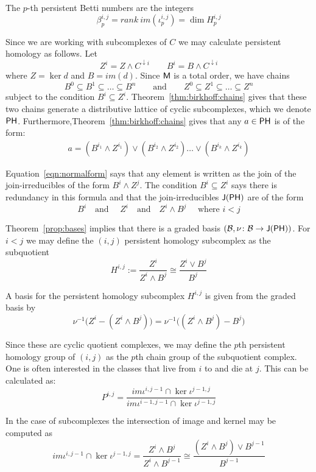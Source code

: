 The $p$-th persistent Betti numbers are the integers $$\beta_p^{i,j} = rank~im(\iota_p^{i,j}) = \dim H_p^{i,j}$$

Since we are working with subcomplexes of $C$ we may calculate persistent homology as follows. Let $$Z^i = Z\wedge C^{\downarrow i} \quad\quad B^i = B\wedge C^{\downarrow i}$$ where $Z=\ker d$ and  $B=im(d)$.   Since ${\mathsf M}$ is a total order, we have chains 
\[
B^0\subseteq B^1\subseteq \ldots \subseteq  B^n\quad \quad\text{and} \quad\quad Z^0\subseteq Z^1 \subseteq \ldots \subseteq Z^n
\]
subject to the condition $B^i\subseteq Z^i$.  Theorem~\ref{thm:birkhoff:chains} gives that these two chains generate a distributive lattice of cyclic subcomplexes, which we denote $\mathsf{PH}$.  Furthermore,Theorem~\ref{thm:birkhoff:chains} gives that any $a\in {\mathsf P}{\mathsf H}$ is of the form:
\begin{align}\label{eqn:normalform}
a = (B^{i_1}\wedge Z^{i_1}) \vee (B^{i_2}\wedge Z^{i_2})\ldots \vee (B^{i_k}\wedge Z^{i_k})
\end{align}

Equation~\ref{eqn:normalform} says that any element is written as the join of the join-irreducibles of the form $B^i\wedge Z^j$.    The condition $B^i\subseteq Z^i$ says there is redundancy in this formula and that the join-irreducibles ${\mathsf J}(\mathsf{PH})$ are of the form
\[
B^i\quad\text{and }\quad Z^i\quad\text{and} \quad Z^i\wedge B^j \quad \text{ where $i<j$}
\]

 Theorem~\ref{prop:bases} implies that there is a graded basis $({\mathcal B},\nu\colon {\mathcal B}\to {\mathsf J}(\mathsf{PH}))$.   For $i<j$ we may define the $(i,j)$ persistent homology subcomplex as the subquotient 
\[
H^{i,j} := \frac{Z^i}{Z^i\wedge B^j} \cong \frac{Z^i\vee B^j}{B^j}
\]

A basis for the persistent homology subcomplex $H^{i,j}$ is given from the graded basis by $$\nu^{-1}\big(Z^i-(Z^i\wedge B^j)\big)=\nu^{-1}\big( (Z^i\wedge B^j) - B^j  \big)$$


Since these are cyclic quotient complexes, we may define the $p$th persistent homology group of $(i,j)$ as the $p$th chain group of the subquotient complex.   One is often interested in the classes that live from $i$ to and die at $j$.  This can be calculated as:
\[
P^{i,j} = \frac{im\iota^{i,j-1}\cap \ker \iota^{j-1,j}}{im \iota^{i-1,j-1}\cap \ker \iota^{j-1,j}}
\]

In the case of subcomplexes the intersection of image and kernel may be computed as
\[
im\iota^{i,j-1}\cap \ker \iota^{j-1,j} = \frac{Z^i\wedge B^j}{Z^i\wedge B^{j-1}} \cong \frac{(Z^i\wedge B^j)\vee B^{j-1}}{B^{j-1}}
\]

